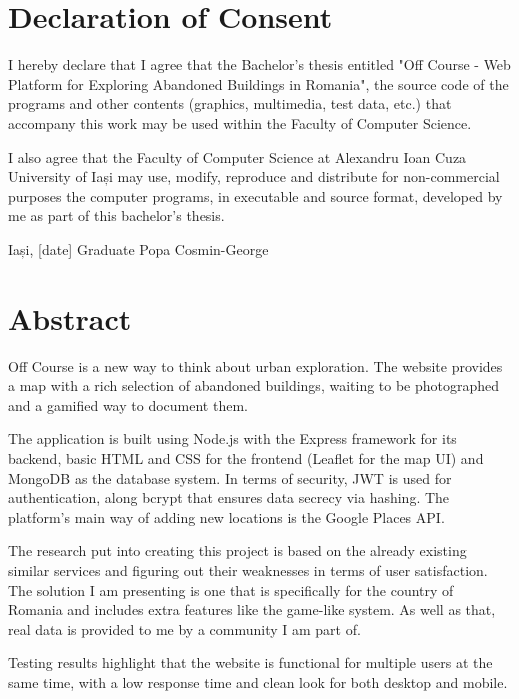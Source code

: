 \documentclass[12pt,a4paper]{report}
\begin{document}
\newpage

\chapter*{Declaration of Consent}

I hereby declare that I agree that the Bachelor's thesis entitled "Off Course - Web Platform for Exploring Abandoned Buildings in Romania", the source code of the programs and other contents (graphics, multimedia, test data, etc.) that accompany this work may be used within the Faculty of Computer Science.

I also agree that the Faculty of Computer Science at Alexandru Ioan Cuza University of Iași may use, modify, reproduce and distribute for non-commercial purposes the computer programs, in executable and source format, developed by me as part of this bachelor's thesis.

\vspace{2cm}
Iași, [date] \hfill Graduate Popa Cosmin-George

\newpage

\tableofcontents
\newpage

\chapter*{Abstract}

Off Course is a new way to think about urban exploration. The website provides a map with a rich selection of abandoned buildings, waiting to be photographed and a gamified way to document them.

The application is built using Node.js with the Express framework for its backend, basic HTML and CSS for the frontend (Leaflet for the map UI) and MongoDB as the database system. In terms of security, JWT is used for authentication, along bcrypt that ensures data secrecy via hashing. The platform's main way of adding new locations is the Google Places API.

The research put into creating this project is based on the already existing similar services and figuring out their weaknesses in terms of user satisfaction. The solution I am presenting is one that is specifically for the country of Romania and includes extra features like the game-like system. As well as that, real data is provided to me by a community I am part of.

Testing results highlight that the website is functional for multiple users at the same time, with a low response time and clean look for both desktop and mobile.
\end{document}
